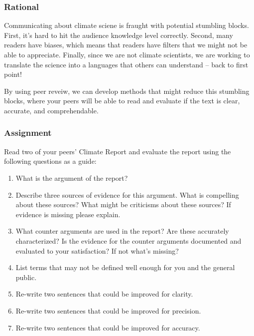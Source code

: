 
\subsubsection{Rational}

Communicating about climate sciene is fraught with potential stumbling blocks. First, it's hard to hit the audience knowledge level correctly. Second, many readers have biases, which means that readers have filters that we might not be able to appreciate. Finally, since we are not climate scientists, we are working to translate the science into a languages that others can understand -- back to first point!  

By using peer reveiw, we can develop methods that might reduce this stumbling blocks, where your peers will be able to read and evaluate if the text is clear, accurate, and comprehendable. 

\subsubsection{Assignment}

Read two of your peers' Climate Report and evaluate the report using the following questions as a guide:

\begin{enumerate}
  \item What is the argument of the report?
  \item Describe three sources of evidence for this argument. What is compelling about these sources? What might be criticisms about these sources? If evidence is missing please explain.
  \item What counter arguments are used in the report? Are these accurately characterized? Is the evidence for the counter arguments documented and evaluated to your satisfaction?  If not what's missing?
  \item List terms that may not be defined well enough for you and the general public. 
  \item Re-write two sentences that could be improved for clarity.
  \item Re-write two sentences that could be improved for precision.
  \item Re-write two sentences that could be improved for accuracy.
\end{enumerate}

